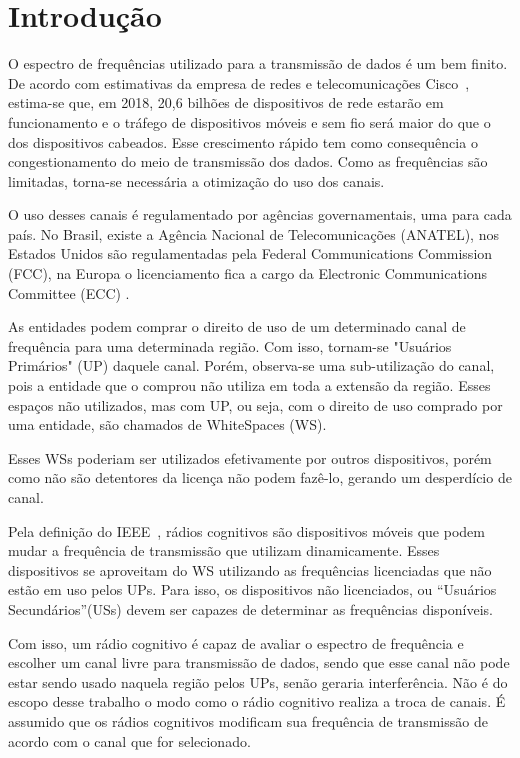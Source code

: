 \chapter{Introdução}

O espectro de frequências utilizado para a transmissão de dados é um bem finito. De acordo com estimativas da empresa de redes e telecomunicações Cisco~\cite{ciscoforecast}, estima-se que, em 2018, 20,6 bilhões de dispositivos de rede estarão em funcionamento e o tráfego de dispositivos móveis e sem fio será maior do que o dos dispositivos cabeados. Esse crescimento rápido tem como consequência o congestionamento do meio de transmissão dos dados. Como as frequências são limitadas, torna-se necessária a otimização do uso dos canais.

O uso desses canais é regulamentado por agências governamentais, uma para cada país. No Brasil, existe a Agência Nacional de Telecomunicações (ANATEL),
nos Estados Unidos são regulamentadas pela Federal Communications Commission (FCC),
na Europa o licenciamento fica a cargo da Electronic Communications Committee (ECC)
.

As entidades podem comprar o direito de uso de um determinado canal de frequência para uma determinada região. Com isso, tornam-se "Usuários Primários" (UP)  daquele canal. Porém, observa-se uma sub-utilização do canal, pois a entidade que o comprou não utiliza em toda a extensão da região. Esses espaços não utilizados, mas com UP, ou seja, com o direito de uso comprado por uma entidade, são chamados de WhiteSpaces (WS).
  
Esses WSs poderiam ser utilizados efetivamente por outros dispositivos, porém como não são detentores da licença não podem fazê-lo, gerando um desperdício de canal.

Pela definição do IEEE~\cite{ieee80222}, rádios cognitivos são dispositivos móveis que podem mudar a frequência de transmissão que utilizam dinamicamente. Esses dispositivos se aproveitam do WS utilizando as frequências licenciadas que não estão em uso pelos UPs. Para isso, os dispositivos não licenciados, ou ``Usuários Secundários''(USs)
devem ser capazes de determinar as frequências disponíveis.

Com isso, um rádio cognitivo é capaz de avaliar o espectro de frequência e escolher um canal livre para transmissão de dados, sendo que esse canal não pode estar sendo usado naquela região pelos UPs, senão geraria interferência. Não é do escopo desse trabalho o modo como o rádio cognitivo realiza a troca de canais. É assumido que os rádios cognitivos modificam sua frequência de transmissão de acordo com o canal que for selecionado.

